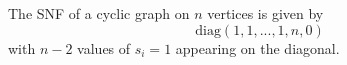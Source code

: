 \begin{theorem}
    The SNF of a cyclic graph on $n$ vertices is given by $$\text{diag}(1,1,...,1,n,0)$$ with $n-2$ values of $s_i = 1$ appearing on the diagonal.
\end{theorem}